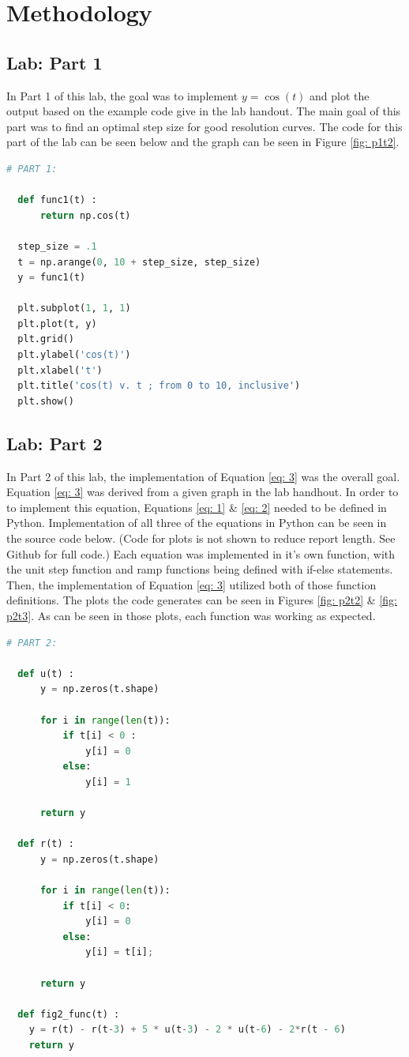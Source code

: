 \documentclass[12pt]{report}
\begin{document}
\section{Methodology}
\subsection{Lab: Part 1}
In Part 1 of this lab, the goal was to implement $y=\cos{(t)}$ and plot the output based on the example code give in the lab handout. The main goal of this part 
was to find an optimal step size for good resolution curves. The code for this part of the lab can be seen below and the graph can be seen in Figure \ref{fig: p1t2}.
\begin{lstlisting}[language=Python, basicstyle=\footnotesize]
  # PART 1:

  def func1(t) :
      return np.cos(t)

  step_size = .1
  t = np.arange(0, 10 + step_size, step_size)
  y = func1(t)

  plt.subplot(1, 1, 1)
  plt.plot(t, y)
  plt.grid()
  plt.ylabel('cos(t)')
  plt.xlabel('t')
  plt.title('cos(t) v. t ; from 0 to 10, inclusive')
  plt.show()
\end{lstlisting}
\subsection{Lab: Part 2}
In Part 2 of this lab, the implementation of Equation \eqref{eq: 3} was the overall goal. Equation \eqref{eq: 3} was derived from a given graph in the lab handhout. In order to to
implement this equation, Equations \eqref{eq: 1} \& \eqref{eq: 2} needed to be defined in Python. Implementation of all three of the equations in Python can be seen in the source 
code below. (Code for plots is not shown to reduce report length. See Github for full code.) 
Each equation was implemented in it's own function, with the unit step function and ramp functions being defined with if-else statements. Then, the implementation of 
Equation \eqref{eq: 3} utilized both of those function definitions. The plots the code generates can be seen in Figures \ref{fig: p2t2} \& \ref{fig: p2t3}. As can be seen in those plots,
each function was working as expected.
\begin{lstlisting}[language=Python, basicstyle=\footnotesize]
  # PART 2:

  def u(t) :
      y = np.zeros(t.shape)
      
      for i in range(len(t)):
          if t[i] < 0 :
              y[i] = 0
          else:
              y[i] = 1
      
      return y

  def r(t) :
      y = np.zeros(t.shape)
      
      for i in range(len(t)):
          if t[i] < 0:
              y[i] = 0
          else:
              y[i] = t[i];

      return y

  def fig2_func(t) :
    y = r(t) - r(t-3) + 5 * u(t-3) - 2 * u(t-6) - 2*r(t - 6)
    return y
\end{lstlisting}
\end{document}
